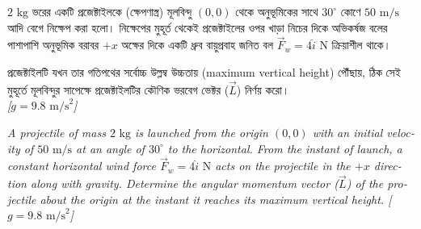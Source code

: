 \documentclass[12pt, a4paper]{article}
\begin{document}
\begin{tcolorbox}[questionbox={প্রশ্ন (Question) 7}]
\noindent
$2\text{ kg}$ ভরের একটি প্রজেক্টাইলকে (ক্ষেপণাস্ত্র) মূলবিন্দু $(0,0)$ থেকে অনুভূমিকের সাথে $30^\circ$ কোণে $50\text{ m/s}$ আদি বেগে নিক্ষেপ করা হলো। নিক্ষেপের মুহূর্ত থেকেই প্রজেক্টাইলের ওপর খাড়া নিচের দিকে অভিকর্ষজ বলের পাশাপাশি অনুভূমিক বরাবর $+x$ অক্ষের দিকে একটি ধ্রুব বায়ুপ্রবাহ জনিত বল $\vec{F}_w = 4\hat{i}\text{ N}$ ক্রিয়াশীল থাকে। 

\vspace{0.3em}
\noindent
প্রজেক্টাইলটি যখন তার গতিপথের সর্বোচ্চ উল্লম্ব উচ্চতায় (maximum vertical height) পৌঁছায়, ঠিক সেই মুহূর্তে মূলবিন্দুর সাপেক্ষে প্রজেক্টাইলটির কৌণিক ভরবেগ ভেক্টর ($\vec{L}$) নির্ণয় করো। \\
\textit{[$g = 9.8\text{ m/s}^2$]}

\vspace{0.8em}
\begin{english}
\noindent\textit{\color{darkgray}
A projectile of mass $2\text{ kg}$ is launched from the origin $(0,0)$ with an initial velocity of $50\text{ m/s}$ at an angle of $30^\circ$ to the horizontal. From the instant of launch, a constant horizontal wind force $\vec{F}_w = 4\hat{i}\text{ N}$ acts on the projectile in the $+x$ direction along with gravity. Determine the angular momentum vector ($\vec{L}$) of the projectile about the origin at the instant it reaches its maximum vertical height. [$g = 9.8\text{ m/s}^2$]
}
\end{english}
\end{tcolorbox}
\end{document}
